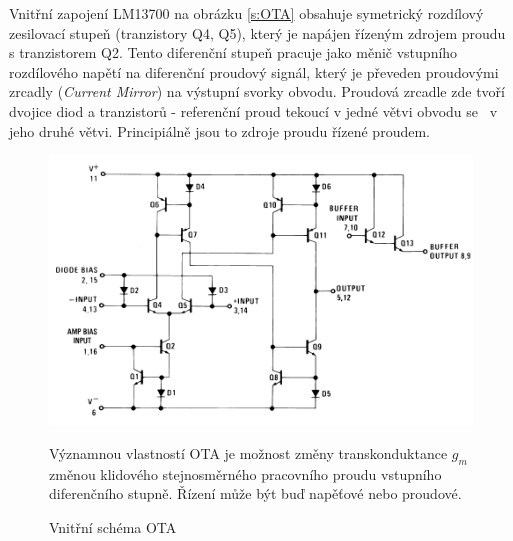 \noindent Vnitřní zapojení LM13700 na obrázku \ref{s:OTA} obsahuje symetrický rozdílový zesilovací stupeň (tranzistory Q4, Q5), který je napájen řízeným zdrojem proudu s tranzistorem Q2. Tento diferenční stupeň pracuje jako měnič vstupního rozdílového napětí na diferenční proudový signál, který je převeden proudovými zrcadly (\textit{Current Mirror}) na výstupní svorky obvodu. Proudová zrcadle zde tvoří dvojice diod a tranzistorů - referenční proud tekoucí v jedné větvi obvodu se  ~v jeho druhé větvi. Principiálně jsou to zdroje proudu řízené proudem. 
\begin{figure}[h]
\centering
\includegraphics[scale=0.75]{image5.png}
\caption[Vnitřní schéma OTA]{Vnitřní schéma OTA \cite{10}\label{sec:OTA}}
\noindent Významnou vlastností OTA je možnost změny transkonduktance $g_m$ změnou klidového stejnosměrného pracovního proudu vstupního diferenčního stupně. Řízení může být buď napěťové nebo proudové.
\end{figure}
